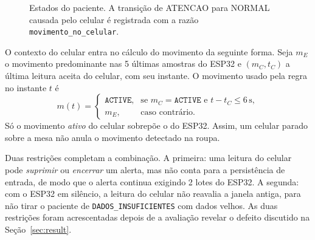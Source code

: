 \documentclass[12pt,a4paper]{article}
\begin{document}
\begin{figure}[ht]
\centering
{}
\caption{Estados do paciente. A transição de ATENCAO para NORMAL causada pelo celular é registrada com a razão \texttt{movimento\_no\_celular}.}\label{fig:estados}
\end{figure}

O contexto do celular entra no cálculo do movimento da seguinte forma.
Seja $m_E$ o movimento predominante nas 5 últimas amostras do ESP32 e $(m_C, t_C)$ a última leitura aceita do celular, com seu instante.
O movimento usado pela regra no instante $t$ é
\begin{equation}
  m(t) = \begin{cases}
    \texttt{ACTIVE}, & \text{se } m_C = \texttt{ACTIVE} \text{ e } t - t_C \le 6\,\text{s},\\
    m_E, & \text{caso contrário.}
  \end{cases}
\end{equation}
Só o movimento \emph{ativo} do celular sobrepõe o do ESP32.
Assim, um celular parado sobre a mesa não anula o movimento detectado na roupa.

Duas restrições completam a combinação.
A primeira: uma leitura do celular pode \emph{suprimir} ou \emph{encerrar} um alerta, mas não conta para a persistência de entrada, de modo que o alerta continua exigindo 2 lotes do ESP32.
A segunda: com o ESP32 em silêncio, a leitura do celular não reavalia a janela antiga, para não tirar o paciente de \texttt{DADOS\_INSUFICIENTES} com dados velhos.
As duas restrições foram acrescentadas depois de a avaliação revelar o defeito discutido na Seção~\ref{sec:result}.
\end{document}
